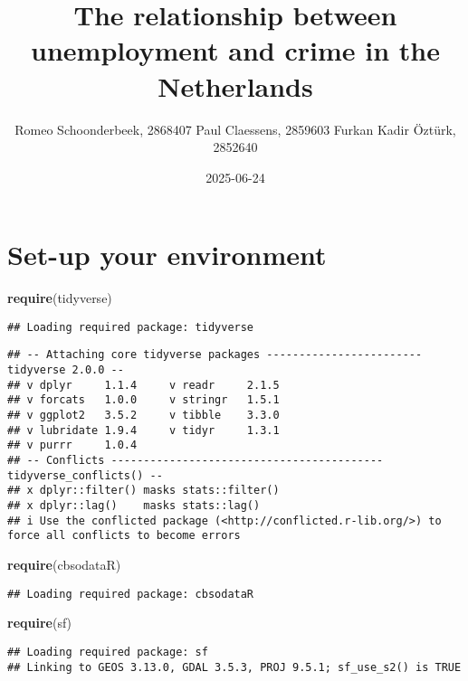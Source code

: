 \documentclass[
]{article}
\title{The relationship between unemployment and crime in the
Netherlands}
\author{Romeo Schoonderbeek, 2868407 Paul Claessens, 2859603 Furkan
Kadir Öztürk, 2852640}
\date{2025-06-24}
\newenvironment{Shaded}{\begin{snugshade}}{\end{snugshade}}
\newcommand{\FunctionTok}[1]{\textcolor[rgb]{0.13,0.29,0.53}{\textbf{#1}}}
\newcommand{\NormalTok}[1]{#1}
\begin{document}
\maketitle

\section{Set-up your environment}\label{set-up-your-environment}

\begin{Shaded}
\begin{Highlighting}[]
\FunctionTok{require}\NormalTok{(tidyverse)}
\end{Highlighting}
\end{Shaded}

\begin{verbatim}
## Loading required package: tidyverse
\end{verbatim}

\begin{verbatim}
## -- Attaching core tidyverse packages ------------------------ tidyverse 2.0.0 --
## v dplyr     1.1.4     v readr     2.1.5
## v forcats   1.0.0     v stringr   1.5.1
## v ggplot2   3.5.2     v tibble    3.3.0
## v lubridate 1.9.4     v tidyr     1.3.1
## v purrr     1.0.4     
## -- Conflicts ------------------------------------------ tidyverse_conflicts() --
## x dplyr::filter() masks stats::filter()
## x dplyr::lag()    masks stats::lag()
## i Use the conflicted package (<http://conflicted.r-lib.org/>) to force all conflicts to become errors
\end{verbatim}

\begin{Shaded}
\begin{Highlighting}[]
\FunctionTok{require}\NormalTok{(cbsodataR)}
\end{Highlighting}
\end{Shaded}

\begin{verbatim}
## Loading required package: cbsodataR
\end{verbatim}

\begin{Shaded}
\begin{Highlighting}[]
\FunctionTok{require}\NormalTok{(sf)}
\end{Highlighting}
\end{Shaded}

\begin{verbatim}
## Loading required package: sf
## Linking to GEOS 3.13.0, GDAL 3.5.3, PROJ 9.5.1; sf_use_s2() is TRUE
\end{verbatim}
\end{document}
